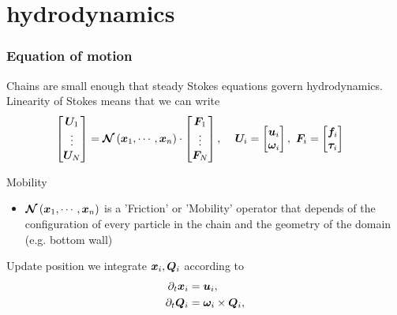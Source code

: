 \documentclass{beamer}
\begin{document}
\section{hydrodynamics}

\begin{frame}
\frametitle{Equation of motion}

Chains are small enough that steady Stokes equations govern hydrodynamics. Linearity of Stokes means that we can write 
\begin{align}
 \begin{bmatrix} \boldsymbol{U}_1 \\ \vdots \\ \boldsymbol{U}_N \end{bmatrix} &=  \boldsymbol{\mathcal{N}} \left( \boldsymbol{x}_1,\cdots,\boldsymbol{x}_n \right) \cdot \begin{bmatrix} \boldsymbol{F}_1 \\ \vdots \\ \boldsymbol{F}_N \end{bmatrix}, \ \ \ \,\boldsymbol{U}_i = \begin{bmatrix} \boldsymbol{u}_i \\ \boldsymbol{\omega}_i \end{bmatrix}, \ \boldsymbol{F}_i = \begin{bmatrix} \boldsymbol{f}_i \\ \boldsymbol{\tau}_i \end{bmatrix}
\end{align}
\vspace{-0.5cm}
\begin{alertblock}{Mobility}
\begin{itemize}
\item $\boldsymbol{\mathcal{N}} \left( \boldsymbol{x}_1,\cdots,\boldsymbol{x}_n \right)$ is a 'Friction' or 'Mobility' operator that depends of the configuration of every particle in the chain and the geometry of the domain (e.g. bottom wall)
\end{itemize}
\end{alertblock}
\begin{exampleblock}{Update position}
we integrate $\boldsymbol{x}_i, \boldsymbol{Q}_i$ according to 
\vspace{-0.25cm}
\begin{align}
 \partial_{t} \V{x}_i &=  \V{u}_i, \\
 \partial_{t} \M{Q}_i &= \V{\omega}_i \times \M{Q}_i,
 \vspace{-0.25cm}
\end{align}
\end{exampleblock}

\end{frame}
\end{document}
